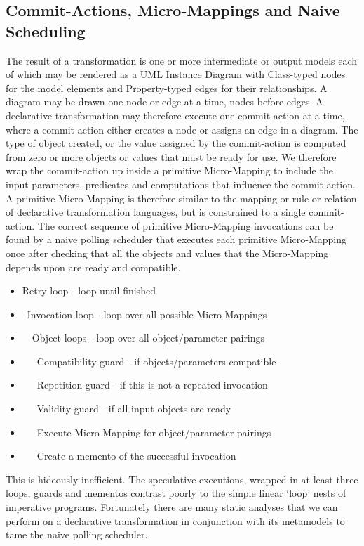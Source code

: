 \documentclass[conference]{IEEEtran}
\begin{document}
\subsection{Commit-Actions, Micro-Mappings and Naive Scheduling}

The result of a transformation is one or more intermediate or output models each of which may be rendered as a UML Instance Diagram with Class-typed nodes for the model elements and Property-typed edges for their relationships. A diagram may be drawn one node or edge at a time, nodes before edges. A declarative transformation may therefore execute one commit action at a time, where a commit action either creates a node or assigns an edge in a diagram. The type of object created, or the value assigned by the commit-action is computed from zero or more objects or values that must be ready for use. We therefore wrap the commit-action up inside a primitive Micro-Mapping to include the input parameters, predicates and computations that influence the commit-action. A primitive Micro-Mapping is therefore similar to the mapping or rule or relation of declarative transformation languages, but is constrained to a single commit-action. The correct sequence of primitive Micro-Mapping invocations can be found by a naive polling scheduler that executes each primitive Micro-Mapping  once after checking that all the objects and values that the Micro-Mapping depends upon are ready and compatible.

\begin{itemize}
\item Retry loop - loop until finished
\item ~Invocation loop - loop over all possible Micro-Mappings 
\item ~~Object loops - loop over all object/parameter pairings
\item ~~~Compatibility guard - if objects/parameters compatible
\item ~~~Repetition guard - if this is not a repeated invocation
\item ~~~Validity guard - if all input objects are ready
\item ~~~Execute Micro-Mapping for object/parameter pairings
\item ~~~Create a memento of the successful invocation
\end{itemize}

This is hideously inefficient. The speculative executions, wrapped in at least three loops, guards and mementos contrast poorly to the simple linear `loop' nests of imperative programs. Fortunately there are many static analyses that we can perform on a declarative transformation in conjunction with its metamodels to tame the naive polling scheduler.
\end{document}
